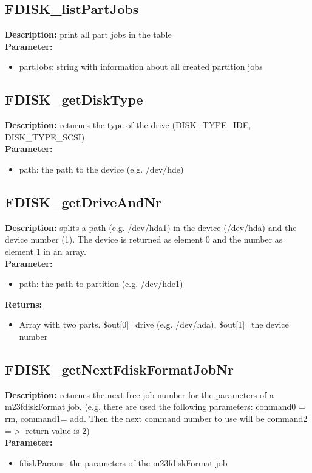 \subsection{FDISK\_listPartJobs}
\textbf{Description:} print all part jobs in the table\\
\textbf{Parameter:}
\begin{itemize}
\item partJobs: string with information about all created partition jobs
\end{itemize}

\subsection{FDISK\_getDiskType}
\textbf{Description:} returnes the type of the drive (DISK\_TYPE\_IDE, DISK\_TYPE\_SCSI)\\
\textbf{Parameter:}
\begin{itemize}
\item path: the path to the device (e.g. /dev/hde)
\end{itemize}

\subsection{FDISK\_getDriveAndNr}
\textbf{Description:} splits a path (e.g. /dev/hda1) in the device (/dev/hda) and the device number (1). The device is returned as element 0 and the number as element 1 in an array.\\
\textbf{Parameter:}
\begin{itemize}
\item path: the path to partition (e.g. /dev/hde1)
\end{itemize}
\textbf{Returns:}
\begin{itemize}
\item Array with two parts. \$out[0]=drive (e.g. /dev/hda), \$out[1]=the device number
\end{itemize}

\subsection{FDISK\_getNextFdiskFormatJobNr}
\textbf{Description:} returnes the next free job number for the parameters of a m23fdiskFormat job. (e.g. there are used the following parameters: command0 = rm, command1= add. Then the next command number to use will be command2 =$>$ return value is 2)\\
\textbf{Parameter:}
\begin{itemize}
\item fdiskParams: the parameters of the m23fdiskFormat job
\end{itemize}

